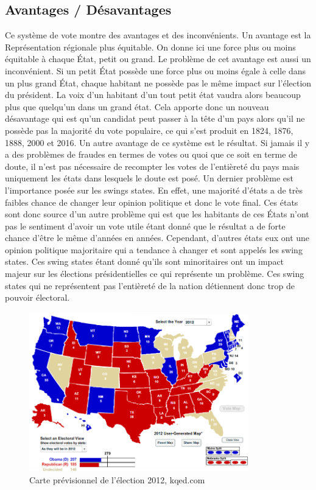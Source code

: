 \documentclass[11pt,a4paper]{report}
\begin{document}
\subsection{Avantages / Désavantages} %
Ce système de vote montre des avantages et des inconvénients.
Un avantage est la Représentation régionale plus équitable.
On donne ici une force plus ou moins équitable à chaque État, petit ou grand.
Le problème de cet avantage est aussi un inconvénient.
Si un petit État possède une force plus ou moins égale à celle dans un plus grand État, chaque habitant ne possède pas le même impact sur l'élection du président.
La voix d’un habitant d’un tout petit état vaudra alors beaucoup plus que quelqu’un dans un grand état.
Cela apporte donc un nouveau désavantage qui est qu’un candidat peut passer à la tête d’un pays alors qu’il ne possède pas la majorité du vote populaire, ce qui s’est produit en 1824, 1876, 1888, 2000 et 2016.
Un autre avantage de ce système est le résultat.
Si jamais il y a des problèmes de fraudes en termes de votes ou quoi que ce soit en terme de doute, il n’est pas nécessaire de recompter les votes de l'entièreté du pays mais uniquement les états dans lesquels le doute est posé.
Un dernier problème est l’importance posée sur les swings states.
En effet, une majorité d’états a de très faibles chance de changer leur opinion politique et donc le vote final.
Ces états sont donc source d’un autre problème qui est que les habitants de ces États n’ont pas le sentiment d’avoir un vote utile étant donné que le résultat a de forte chance d’être le même d’années en années.
Cependant, d’autres états eux ont une opinion politique majoritaire qui a tendance à changer et sont appelés les swing states.
Ces swing states étant donné qu’ils sont minoritaires ont un impact majeur sur les élections présidentielles ce qui représente un problème.
Ces swing states qui ne représentent pas l'entièreté de la nation détiennent donc trop de pouvoir électoral.
\nocite{greelane:eleccoll}
\nocite{gov:fedpapers68}

\begin{figure}[h]
	\centering
	\includegraphics[width=0.85\textwidth]{./images/2012-election.png}
	\caption{Carte prévisionnel de l'élection 2012, kqed.com \cite{kqed:map}}
	\label{map:uselec2012}
\end{figure}
\end{document}
